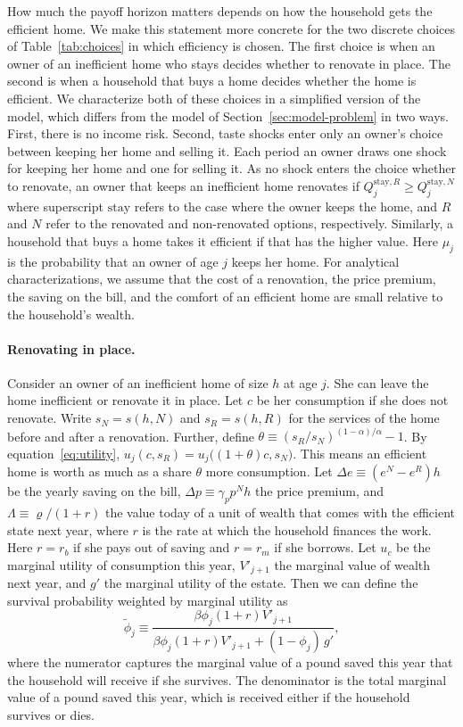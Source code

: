 How much the payoff horizon matters depends on how the household gets
the efficient home.  We make this statement more concrete for the two discrete choices of
Table~\ref{tab:choices} in which efficiency is chosen. The first choice is when  an owner of an
inefficient home who stays decides whether to renovate in place. The second is when a
household that buys a home decides whether the home is efficient. We 
characterize both of these choices in a simplified version of the model, which
differs from the model of Section~\ref{sec:model-problem} in  two
ways. First, there is no income risk. Second, taste shocks enter only an
owner's choice between keeping her home and selling it. Each period an owner
draws one shock for keeping her home and one for selling it. As no shock enters the choice whether to renovate, an
owner that keeps an inefficient home renovates if
 $Q_j^{\mathrm{stay},R}\ge Q_j^{\mathrm{stay},N}$ where superscript $\text{stay}$ refers to the case where the owner keeps the home, and $R$ and $N$ refer to the renovated and non-renovated options, respectively. Similarly, a household that buys a home takes it efficient if that has the higher value. Here $\mu_j$ is the probability that an owner of age $j$ keeps her home.  For analytical characterizations, we assume that the cost of a renovation, the price premium,
the saving on the bill, and the comfort of an efficient home are small
relative to the household's wealth.



\paragraph{Renovating in place.}
Consider an owner of an inefficient home of size $h$ at age $j$. She can leave the home
inefficient or renovate it in place. Let $c$ be her
consumption if she does not renovate. Write $s_N=s(h,N)$ and $s_R=s(h,R)$ for the services of the home before and after a renovation. Further, define
$\theta\equiv(s_R/s_N)^{(1-\alpha)/\alpha}-1$. By
equation~\eqref{eq:utility}, $u_j(c,s_R)=u_j\bigl((1+\theta)c,s_N\bigr)$. This means
an efficient home is worth as much as a share $\theta$ more consumption. Let
$\Delta e\equiv(e^N-e^R)h$ be the yearly saving on the bill,
$\Delta p\equiv\gamma_pp^Nh$ the price premium, and
$\Lambda\equiv\varrho/(1+r)$ the value today of a unit of wealth that comes
with the efficient state next year, where $r$ is the rate at which the
household finances the work. Here $r = r_b$ if she pays out of saving and $r = r_m$ if
she borrows. Let $u_c$ be the marginal utility of consumption this year,
$V'_{j+1}$ the marginal value of wealth next year, and $g'$ the marginal
utility of the estate. Then we can define the survival probability weighted by marginal utility as
\begin{equation}
  \tilde\phi_j\equiv\frac{\beta\phi_j(1+r)V'_{j+1}}
  {\beta\phi_j(1+r)V'_{j+1}+(1-\phi_j)\,g'},
  \label{eq:phi-tilde}
\end{equation}
where the numerator captures the marginal value of a pound saved this year that the household will receive if she survives. The denominator is the total marginal value of a pound saved this year, which is received either if the household survives or dies. 




